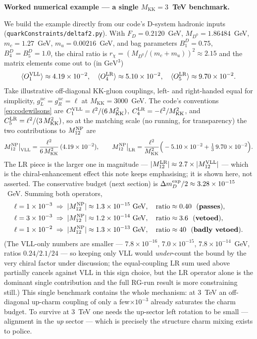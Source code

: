 \documentclass[11pt]{article}
\newenvironment{callout}[1]{%
  \par\medskip\begin{shaded}\noindent\textbf{#1}\par\smallskip}{\end{shaded}\medskip}
\newcommand{\MKK}{M_{\mathrm{KK}}}
\newcommand{\code}[1]{\texttt{#1}}
\newcommand{\Mtwelve}{M_{12}}
\newcommand{\dmD}{\Delta m_D}
\theoremstyle{definition}
\begin{document}
\begin{callout}{Worked numerical example --- a single $\MKK=3$~TeV benchmark.}
We build the example directly from our code's D-system hadronic inputs
(\code{quarkConstraints/deltaf2.py}). With
$F_D=0.2120$~GeV, $M_{D^0}=1.86484$~GeV, $m_c=1.27$~GeV, $m_u=0.00216$~GeV,
and bag parameters $B_1^D=0.75$, $B_4^D=B_5^D=1.0$, the chiral ratio is
$r_\chi = (M_{D^0}/(m_c+m_u))^2 \approx 2.15$ and the matrix elements come out
to (in $\mathrm{GeV}^3$)
\[
\langle O_1^{\rm VLL}\rangle \approx 4.19\times10^{-2},\quad
\langle O_4^{\rm LR}\rangle \approx 5.10\times10^{-2},\quad
\langle O_5^{\rm LR}\rangle \approx 9.70\times10^{-2}.
\]
Take illustrative off-diagonal KK-gluon couplings, left- and right-handed equal
for simplicity, $g_L^{uc}=g_R^{uc}=\ell$ at $\MKK=3000$~GeV. The code's
conventions \eqref{eq:codewilsons} are
$C_1^{\rm VLL} = \ell^2/(6\,\MKK^2)$,
$C_4^{\rm LR} = -\ell^2/\MKK^2$, and
$C_5^{\rm LR} = \ell^2/(3\,\MKK^2)$, so at the matching scale (no running, for
transparency) the two contributions to $\Mtwelve^{\rm NP}$ are
\[
\Mtwelve^{\rm NP}\big|_{\rm VLL}
= \frac{\ell^2}{6\,\MKK^2}\,(4.19\times10^{-2}),\qquad
\Mtwelve^{\rm NP}\big|_{\rm LR}
= \frac{\ell^2}{\MKK^2}\Big(-5.10\times10^{-2}+\tfrac13\,9.70\times10^{-2}\Big).
\]
The LR piece is the larger one in magnitude --- $|\Mtwelve^{\rm LR}|\approx
2.7\times|\Mtwelve^{\rm VLL}|$ --- which is the chiral-enhancement effect this
note keeps emphasising; it is shown here, not asserted. The conservative budget
(next section) is $\dmD^{\rm exp}/2 \approx 3.28\times10^{-15}$~GeV. Summing both
operators,
\begin{align*}
\ell = 1\times10^{-3} &\;\Rightarrow\; |\Mtwelve^{\rm NP}| \approx 1.3\times10^{-15}\ \mathrm{GeV},\quad \text{ratio} \approx 0.40\ \ (\textbf{passes}),\\
\ell = 3\times10^{-3} &\;\Rightarrow\; |\Mtwelve^{\rm NP}| \approx 1.2\times10^{-14}\ \mathrm{GeV},\quad \text{ratio} \approx 3.6\ \ (\textbf{vetoed}),\\
\ell = 1\times10^{-2} &\;\Rightarrow\; |\Mtwelve^{\rm NP}| \approx 1.3\times10^{-13}\ \mathrm{GeV},\quad \text{ratio} \approx 40\ \ (\textbf{badly vetoed}).
\end{align*}
(The VLL-only numbers are smaller --- $7.8\times10^{-16}$, $7.0\times10^{-15}$,
$7.8\times10^{-14}$~GeV, ratios $0.24/2.1/24$ --- so keeping only VLL would
\emph{under}-count the bound by the very chiral factor under discussion; the
equal-coupling LR sum used above partially cancels against VLL in this sign
choice, but the LR operator alone is the dominant single contribution and the
full RG-run result is more constraining still.) This single benchmark contains
the whole mechanism: at $3$~TeV an off-diagonal up-charm coupling of only a
few$\times10^{-3}$ already saturates the charm budget. To survive at $3$~TeV one
needs the up-sector left rotation to be small --- alignment in the \emph{up}
sector --- which is precisely the structure charm mixing exists to police.
\end{callout}
\end{document}
